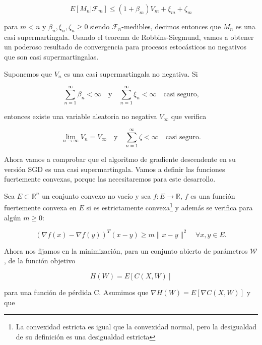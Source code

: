 \begin{equation*}
	E[M_n | \mathcal{F}_m] \leq (1 + \beta _m ) V_m + \xi _m + \zeta _m
\end{equation*}

para $m<n$ y $\beta _n, \xi _n, \zeta _n \geq 0$ siendo $\mathcal{F}_n$-medibles, decimos entonces que $M_n$ es una casi supermartingala. Usando el teorema de Robbins-Siegmund, vamos a obtener un poderoso resultado de convergencia para procesos estocásticos no negativos que son casi supermartingalas.

\begin{teorema}\label{teor:sig}
	Suponemos que $V_n$ es una casi supermartingala no negativa. Si 

	$$ \sum_{n=1}^{\infty} \beta_n < \infty \quad \text{y} \quad \sum_{n=1}^{\infty} \xi_n < \infty \quad \text{casi seguro,}$$

	entonces existe una variable aleatoria no negativa $V_{\infty}$ que verifica

	$$ \displaystyle \lim_{n \to \infty}V_n = V_{\infty} \quad \text{y} \quad \sum_{n=1}^{\infty} \zeta < \infty \quad \text{casi seguro.}$$
\end{teorema}


Ahora vamos a comprobar que el algoritmo de gradiente descendente en su versión SGD es una casi supermartingala. Vamos a definir las funciones fuertemente convexas, porque las necesitaremos para este desarrollo. 

\begin{definicion}
	Sea $E \subset \mathbb{R}^n$ un conjunto convexo no vacío y sea $f:E \rightarrow \mathbb{R}$, $f$ es una función fuertemente convexa en $E$ si es estrictamente convexa\footnote{La convexidad estricta es igual que la convexidad normal, pero la desigualdad de su definición es una desigualdad estricta} y además se verifica para algún $m \geq 0$:

   	$$( \nabla f(x) - \nabla f(y))^T(x-y) \geq m \|x-y\|^2 \quad  \forall x,y \in E.$$
\end{definicion}

Ahora nos fijamos en la minimización, para un conjunto abierto de parámetros $\mathcal W$, de la función objetivo

\begin{equation}
	H(W) = E[ C(X,W)]
\end{equation}

para una función de pérdida C. Asumimos que $\nabla H(W) = E[\nabla C(X, W)]$ y que 

